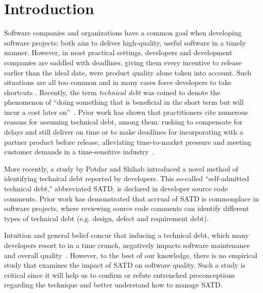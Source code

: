 
\section{Introduction}
\label{chap3:sec:introduction}
Software companies and organizations have a common goal when developing software projects: both aim to deliver high-quality, useful software in a timely manner. However, in most practical settings, developers and development companies are saddled with deadlines, giving them every incentive to release earlier than the ideal date, were product quality alone taken into account. Such situations are all too common and in many cases force developers to take shortcuts \cite{kruchten2013technical} \cite{seaman2015technical}. Recently, the term \emph{technical debt} was coined to denote the phenomenon of ``doing something that is beneficial in the short term but will incur a cost later on''~\cite{cunningham1993wycash}. Prior work has shown that practitioners cite numerous reasons for assuming technical debt, among them: rushing to compensate for delays and still deliver on time or to make deadlines for incorporating with a partner product before release, alleviating time-to-market pressure and meeting customer demands in a time-sensitive industry~\cite{lim2012balancing}.


More recently, a study by Potdar and Shihab \cite{ICSM_PotdarS14} introduced a novel method of identifying technical debt reported by developers. This so-called ``self-admitted technical debt," abbreviated SATD, is declared in developer source code comments. Prior work \cite{MTD15p9} has demonstrated that accrual of SATD is commonplace in software projects, where reviewing source code comments can identify different types of technical debt (e.g. design, defect and requirement debt).

Intuition and general belief concur that inducing a technical debt, which many developers resort to in a time crunch, negatively impacts software maintenance and overall quality~\cite{zazworka2011investigating,spinola2013investigating,GuoSGCTSSS11,seaman2015technical,kruchten2013technical}. However, to the best of our knowledge, there is no empirical study that examines the impact of SATD on software quality. Such a study is critical since it will help us to confirm or refute entrenched preconceptions regarding the technique and better understand how to manage SATD.


